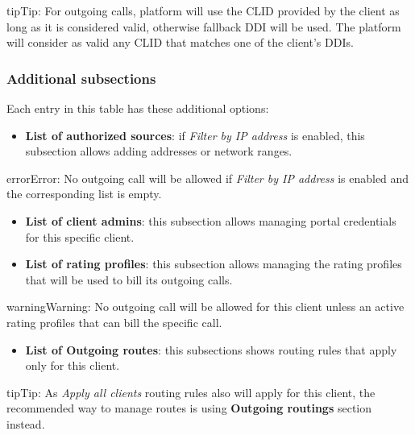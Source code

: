 \documentclass[letterpaper,10pt,english]{sphinxmanual}
\begin{document}
\begin{notice}{tip}{Tip:}
For outgoing calls, platform will use the CLID provided by the client as long as it is considered valid, otherwise fallback DDI
will be used. The platform will consider as valid any CLID that matches one of the client's DDIs.
\end{notice}


\subsubsection{Additional subsections}
\label{administration_portal/brand/clients/residential:additional-subsections}
Each entry in this table has these additional options:
\begin{itemize}
\item {} 
\textbf{List of authorized sources}: if \emph{Filter by IP address} is enabled, this subsection allows adding addresses or network ranges.

\end{itemize}

\begin{notice}{error}{Error:}
No outgoing call will be allowed if \emph{Filter by IP address} is enabled and the corresponding list is empty.
\end{notice}
\begin{itemize}
\item {} 
\textbf{List of client admins}: this subsection allows managing portal credentials for this specific client.

\item {} 
\textbf{List of rating profiles}: this subsection allows managing the rating profiles that will be used to bill its outgoing calls.

\end{itemize}

\begin{notice}{warning}{Warning:}
No outgoing call will be allowed for this client unless an active rating profiles that can
bill the specific call.
\end{notice}
\begin{itemize}
\item {} 
\textbf{List of Outgoing routes}: this subsections shows routing rules that apply only for this client.

\end{itemize}

\begin{notice}{tip}{Tip:}
As \emph{Apply all clients} routing rules also will apply for this client, the recommended way to manage routes is
using \textbf{Outgoing routings} section instead.
\end{notice}
\end{document}

